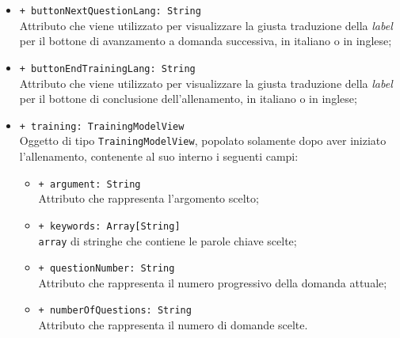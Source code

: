 \begin{itemize}
\begin{itemize}
		\item \texttt{+ buttonNextQuestionLang: String} \\ Attributo che viene utilizzato per visualizzare la giusta traduzione della \textit{label} per il bottone di avanzamento a domanda successiva, in italiano o in inglese;
		\item \texttt{+ buttonEndTrainingLang: String} \\ Attributo che viene utilizzato per visualizzare la giusta traduzione della \textit{label} per il bottone di conclusione dell'allenamento, in italiano o in inglese;
		\item \texttt{+ training: TrainingModelView} \\ Oggetto di tipo \texttt{TrainingModelView}, popolato solamente dopo aver iniziato l'allenamento, contenente al suo interno i seguenti campi:
		\begin{itemize}
			\item \texttt{+ argument: String} \\ Attributo che rappresenta l'argomento scelto;
			\item \texttt{+ keywords: Array[String]} \\ \texttt{array} di stringhe che contiene le parole chiave scelte;
			\item \texttt{+ questionNumber: String} \\ Attributo che rappresenta il numero progressivo della domanda attuale;
			\item \texttt{+ numberOfQuestions: String} \\ Attributo che rappresenta il numero di domande scelte.
		\end{itemize}
	\end{itemize}
\end{itemize}
